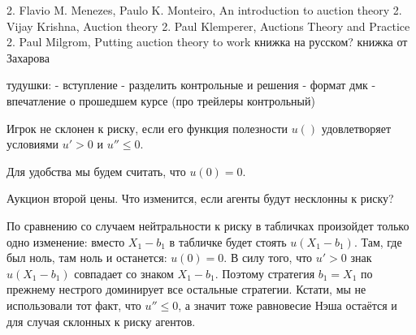 2.	Flavio M. Menezes, Paulo K. Monteiro, An introduction to auction theory
2.	Vijay Krishna, Auction theory
2.	Paul Klemperer, Auctions Theory and Practice
2.	Paul Milgrom, Putting auction theory to work
книжка на русском?
книжка от Захарова

тудушки:
- вступление
- разделить контрольные и решения
- формат дмк
- впечатление о прошедшем курсе (про трейлеры контрольный)



\begin{mydef}
Игрок не склонен к риску, если его функция полезности $ u() $ удовлетворяет условиями $ u'>0 $ и $ u''\leq 0 $.
\end{mydef}

Для удобства мы будем считать, что $ u(0)=0 $.

Аукцион второй цены. Что изменится, если агенты будут несклонны к риску?

По сравнению со случаем нейтральности к риску в табличках произойдет только одно изменение: вместо $ X_{1}-b_{1} $ в табличке будет стоять $ u(X_{1}-b_{1}) $. Там, где был ноль, там ноль и останется: $ u(0)=0 $. В силу того, что $ u'>0 $ знак $ u(X_{1}-b_{1}) $ совпадает со знаком $ X_{1}-b_{1} $. Поэтому стратегия $ b_{1}=X_{1} $ по прежнему нестрого доминирует все остальные стратегии. Кстати, мы не использовали  тот факт, что $u''\leq 0 $, а значит тоже равновесие Нэша остаётся и для случая склонных к риску агентов.









